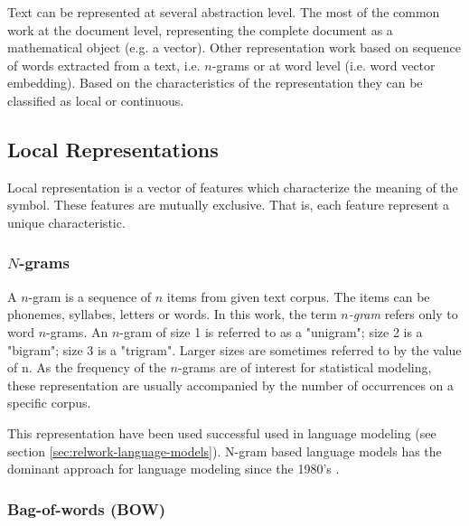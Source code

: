   Text can be represented at several abstraction level.  The most of the
  common work at the document level, representing the complete document as a
  mathematical object (e.g. a vector). Other representation work based on
  sequence of words extracted from a text, i.e. $n$-grams or at word level
  (i.e. word vector embedding). Based on the characteristics of the
  representation they can be classified as local or continuous. 
 
  

\subsection{Local Representations}
 \label{sec:rel_local_representation}
 Local representation is a vector of features which characterize the
 meaning of the symbol. These  features  are mutually exclusive. That is, each feature
 represent a unique characteristic.
 
 \subsubsection{$N$-grams}
 \label{sec:sub_ngrams}

A $n$-gram is a sequence of $n$ items from given text corpus. The items can
be phonemes, syllabes, letters or words. In this  work, the term
\textit{$n$-gram} refers only   to  word $n$-grams.
An $n$-gram of size 1 is referred to as a "unigram"; size 2 is a "bigram";
size 3 is a "trigram". Larger sizes are sometimes referred to by the value of
n. As the frequency of the $n$-grams are of interest for statistical
modeling, these representation are usually accompanied by the number of
occurrences on a specific corpus. 


This representation  have been used successful used in language modeling (see section
\ref{sec:relwork-language-models}). N-gram based language models has the dominant approach for
 language modeling since the 1980's \cite{Bengio:2008}.



 \subsubsection{Bag-of-words (BOW)}
 \label{sec:rel_bow}

